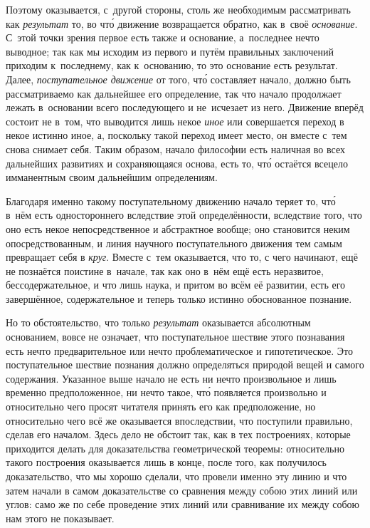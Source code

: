 Поэтому оказывается, с~другой стороны, столь же необходимым рассматривать как
{\em результат} то, во чт\'{о} движение возвращается обратно, как в~своё
{\em основание}. С~этой точки зрения первое есть также и основание, а~последнее
нечто выводное; так как мы исходим из первого и путём правильных заключений
приходим к~последнему, как к~основанию, то это основание есть результат. Далее,
{\em поступательное движение} от того, чт\'{о} составляет начало, должно быть
рассматриваемо как дальнейшее его определение, так что начало продолжает лежать
в~основании всего последующего и не~исчезает из него. Движение вперёд состоит
не в~том, что выводится лишь некое {\em иное} или совершается переход в некое
истинно иное, а, поскольку такой переход имеет место, он вместе с~тем снова
снимает себя. Таким образом, начало философии есть наличная во всех дальнейших
развитиях и сохраняющаяся основа, есть то, чт\'{о} остаётся всецело имманентным
своим дальнейшим определениям.

Благодаря именно такому поступательному движению начало теряет то, чт\'{о}
в~нём есть одностороннего вследствие этой определённости, вследствие того, что
оно есть некое непосредственное и абстрактное вообще; оно становится неким
опосредствованным, и линия научного поступательного движения тем самым
превращает себя в {\em круг}. Вместе с~тем оказывается, что то, с чего
начинают, ещё не познаётся поистине в~начале, так как оно в~нём ещё есть
неразвитое, бессодержательное, и что лишь наука, и притом во всём её развитии,
есть его завершённое, содержательное и теперь только истинно обоснованное
познание.

Но то обстоятельство, что только {\em результат} оказывается абсолютным
основанием, вовсе не означает, что поступательное шествие этого познавания есть
нечто предварительное или нечто проблематическое и гипотетическое. Это
поступательное шествие познания должно определяться природой вещей и самого
содержания. Указанное выше начало не есть ни нечто произвольное и лишь временно
предположенное, ни нечто такое, чт\'{о} появляется произвольно и относительно
чего просят читателя принять его как предположение, но относительно чего всё же
оказывается впоследствии, что поступили правильно, сделав его началом. Здесь
дело не обстоит так, как в тех построениях, которые приходится делать для
доказательства геометрической теоремы: относительно такого построения
оказывается лишь в конце, после того, как получилось доказательство, что мы
хорошо сделали, что провели именно эту линию и что затем начали в самом
доказательстве со сравнения между собою этих линий или углов: само же по себе
проведение этих линий или сравнивание их между собою нам этого не показывает.

